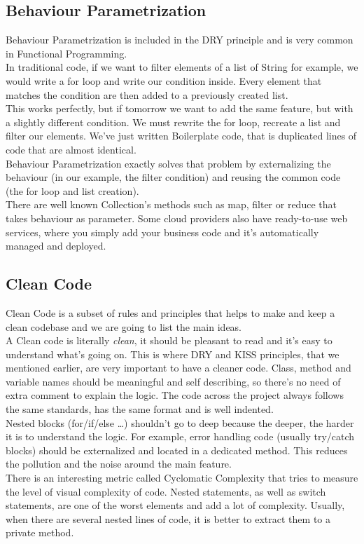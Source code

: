 \subsection{Behaviour Parametrization}
\label{subsec:behaviour-parametrization}
Behaviour Parametrization is included in the DRY principle and is very
common in Functional Programming. \\
\newline
In traditional code, if we want to filter elements of a list of String
for example, we would write a for loop and write our condition inside.
Every element that matches the condition are then added to a previously
created list. \\
This works perfectly, but if tomorrow we want to add the same feature,
but with a slightly different condition.
We must rewrite the for loop, recreate a list and filter our elements.
We've just written Boilerplate code, that is duplicated lines of code
that are almost identical. \\
\newline
Behaviour Parametrization exactly solves that problem by externalizing
the behaviour (in our example, the filter condition) and reusing the
common code (the for loop and list creation). \\
There are well known Collection's methods such as map, filter or reduce
that takes behaviour as parameter.
Some cloud providers also have ready-to-use web services,
where you simply add your business code and it's automatically managed
and deployed.

\subsection{Clean Code}\label{subsec:clean-code}
Clean Code is a subset of rules and principles that helps to make and
keep a clean codebase and we are going to list the main ideas. \\
\newline
A Clean code is literally \textit{clean}, it should be
pleasant to read and it's easy to understand what's going on.
This is where DRY and KISS principles, that we mentioned earlier,
are very important to have a cleaner code.
Class, method and variable names should be meaningful and self
describing, so there's no need of extra comment to explain the logic.
The code across the project always follows the same standards, has the
same format and is well indented. \\
\newline
Nested blocks (for/if/else \ldots) shouldn't go to deep
because the deeper, the harder it is to understand the logic.
For example, error handling code (usually try/catch blocks) should be
externalized and located in a dedicated method.
This reduces the pollution and the noise around the main feature. \\
There is an interesting metric called Cyclomatic Complexity that tries to
measure the level of visual complexity of code.
Nested statements, as well as switch statements, are one of the worst
elements and add a lot of complexity.
Usually, when there are several nested lines of code, it is better to
extract them to a private method.

